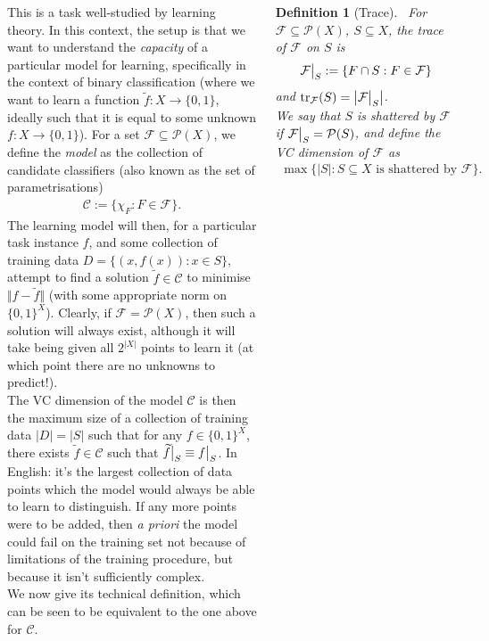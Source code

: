 \documentclass{tikzposter} %
\newcommand{\mc}{\mathcal}
\newcommand\restr[2]{{%
  \left.\kern-\nulldelimiterspace %
  #1 %
  \vphantom{\big|} %
  \right|_{#2} %
  }}
\newtheorem{definition}{Definition}
\begin{document}
\begin{columns}
{      This is a task well-studied by learning theory. In this context, the setup is that we want to understand the \emph{capacity} of a particular model for learning, specifically in the context of binary classification (where we want to learn a function $\widetilde{f} : X \to \{0, 1\}$, ideally such that it is equal to some unknown $f : X \to \{0, 1\}$). For a set $\mc{F} \subseteq \mc{P}(X)$, we define the \emph{model} as the collection of candidate classifiers (also known as the set of parametrisations)
      \begin{align*}
        \mc{C} := \{\chi_F : F \in \mc{F}\}.
      \end{align*}
      The learning model will then, for a particular task instance $f$, and some collection of training data $D = \{(x, f(x)) : x \in S\}$, attempt to find a solution $\widetilde{f} \in \mc{C}$ to minimise $\Vert f - \widetilde{f} \Vert$ (with some appropriate norm on $\{0, 1\}^X$). Clearly, if $\mc{F} = \mc{P}(X)$, then such a solution will always exist, although it will take being given all $2^{|X|}$ points to learn it (at which point there are no unknowns to predict!).\\

      The VC dimension of the model $\mc{C}$ is then the maximum size of a collection of training data $|D| = |S|$ such that for any $f \in \{0, 1\}^X$, there exists $\widetilde{f} \in \mc{C}$ such that $\widetilde{f}\big|_{S} \equiv \restr{f}{S}$. In English: it's the largest collection of data points which the model would always be able to learn to distinguish. If any more points were to be added, then \emph{a priori} the model could fail on the training set not because of limitations of the training procedure, but because it isn't sufficiently complex. \\

      We now give its technical definition, which can be seen to be equivalent to the one above for $\mc{C}$. \\

      \begin{definition}[Trace]
      \ For $\mc{F} \subseteq \mc{P}(X)$, $S \subseteq X$, the trace of $\mc{F}$ on $S$ is
      \begin{align*}
        \restr{\mc{F}}{S} := \{F \cap S : F \in \mc{F}\}
      \end{align*}
      and $\mathrm{tr}_{\mc{F}}(S) = \big|\restr{\mc{F}}{S}\big|$. \\

      We say that $S$ is shattered by $\mc{F}$ if $\restr{\mc{F}}{S} = \mc{P}(S)$, and define the VC dimension of $\mc{F}$ as
      \begin{align*}
        \max\{|S| : S \subseteq X \text{ is shattered by }\mc{F}\}.
      \end{align*}
      \end{definition}
      \hphantom{}

}
\end{columns}
\end{document}
